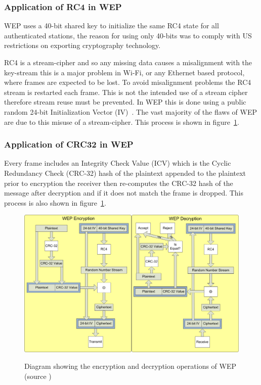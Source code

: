 \documentclass[pdftex, 11pt, a4paper]{article}
\begin{document}
\subsubsection{Application of RC4 in WEP}
WEP uses a 40-bit shared key to initialize the same RC4 state for all authenticated stations, the reason for using only 40-bits was to comply with US restrictions on exporting cryptography technology\cite{wep-evolution}.

RC4 is a stream-cipher and so any missing data causes a misalignment with the key-stream this is a major problem in Wi-Fi, or any Ethernet based protocol, where frames are expected to be lost.
To avoid misalignment problems the RC4 stream is restarted each frame. This is not the intended use of a stream cipher therefore stream reuse must be prevented. In WEP this is done using a public random 24-bit Initialization Vector (IV)~\label{p:iv}.  The vast majority of the flaws of WEP are due to this misuse of a stream-cipher. This process is shown in figure~\ref{fig:wepop}.

\subsubsection{Application of CRC32 in WEP}
Every frame includes an Integrity Check Value (ICV) which is the Cyclic Redundancy Check (CRC-32) hash of the plaintext appended to the plaintext prior to encryption the receiver then re-computes the CRC-32 hash of the message after decryption and if it does not match the frame is dropped. This process is also shown in figure~\ref{fig:wepop}.

\begin{figure}[htb]
\center
\includegraphics[width=0.9\linewidth]{img/wepOperation}\label{fig:wepop}
\caption{Diagram showing the encryption and decryption operations of WEP (source \protect\cite{wep-evolution})}
\end{figure}
\end{document}
